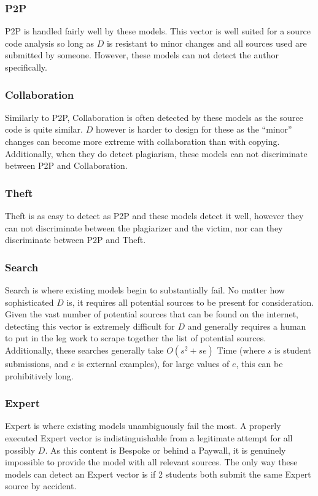 \documentclass[letterpaper,10pt,conference]{IEEEtran}
\begin{document}
	\subsubsection{P2P}
		P2P is handled fairly well by these models.  This vector is well suited for a source code analysis so long as $D$ is resistant to minor changes and all sources used are submitted by someone.  However, these models can not detect the author specifically.
	\subsubsection{Collaboration}
		Similarly to P2P, Collaboration is often detected by these models as the source code is quite similar.  $D$ however is harder to design for these as the ``minor'' changes can become more extreme with collaboration than with copying.  Additionally, when they do detect plagiarism, these models can not discriminate between P2P and Collaboration.
	\subsubsection{Theft}
		Theft is as easy to detect as P2P and these models detect it well, however they can not discriminate between the plagiarizer and the victim, nor can they discriminate between P2P and Theft.
	\subsubsection{Search}
		Search is where existing models begin to substantially fail.  No matter how sophisticated $D$ is, it requires all potential sources to be present for consideration.  Given the vast number of potential sources that can be found on the internet, detecting this vector is extremely difficult for $D$ and generally requires a human to put in the leg work to scrape together the list of potential sources.  Additionally, these searches generally take $O(s^2+se)$ Time (where $s$ is student submissions, and $e$ is external examples), for large values of $e$, this can be prohibitively long.
	\subsubsection{Expert} 
	Expert is where existing models unambiguously fail the most.  A properly executed Expert vector is indistinguishable from a legitimate attempt for all possibly $D$.  As this content is Bespoke or behind a Paywall, it is genuinely impossible to provide the model with all relevant sources.  The only way these models can detect an Expert vector is if 2 students both submit the same Expert source by accident.
\end{document}
